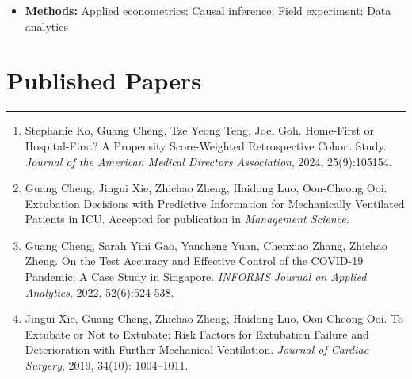 \documentclass[12pt, a4paper]{article}
\begin{document}
{\begin{itemize}[leftmargin=14pt, itemsep=6pt, parsep=0.2pt, topsep=1pt]
	\item[] \textbf{Methods:} Applied econometrics; Causal inference; Field experiment; Data analytics
	
\end{itemize}




\section*{Published Papers}
\vspace*{0.4em}
\hrule height 0.5pt

\begin{enumerate}[leftmargin=28pt, itemsep=6pt, parsep=0.2pt, topsep=1pt]

	\item Stephanie Ko, Guang Cheng, Tze Yeong Teng, Joel Goh. 
	Home-First or Hospital-First? A Propensity Score-Weighted Retrospective Cohort Study.
	{\it Journal of the American Medical Directors Association}, 2024, 25(9):105154.
	
	\item Guang Cheng, Jingui Xie, Zhichao Zheng, Haidong Luo, Oon-Cheong Ooi.
	Extubation Decisions with Predictive Information for Mechanically Ventilated Patients in ICU.
	Accepted for publication in {\it Management Science}.

	\item Guang Cheng, Sarah Yini Gao, Yancheng Yuan, Chenxiao Zhang, Zhichao Zheng. 
	On the Test Accuracy and Effective Control of the COVID-19 Pandemic: A Case Study in Singapore. 
	{\it INFORMS Journal on Applied Analytics}, 2022, 52(6):524-538.

	\item Jingui Xie, Guang Cheng, Zhichao Zheng, Haidong Luo, Oon-Cheong Ooi. 
	To Extubate or Not to Extubate: Risk Factors for Extubation Failure and Deterioration with Further Mechanical Ventilation. 
	{\it Journal of Cardiac Surgery}, 2019, 34(10): 1004–1011. 

\end{enumerate}




}
\end{document}
